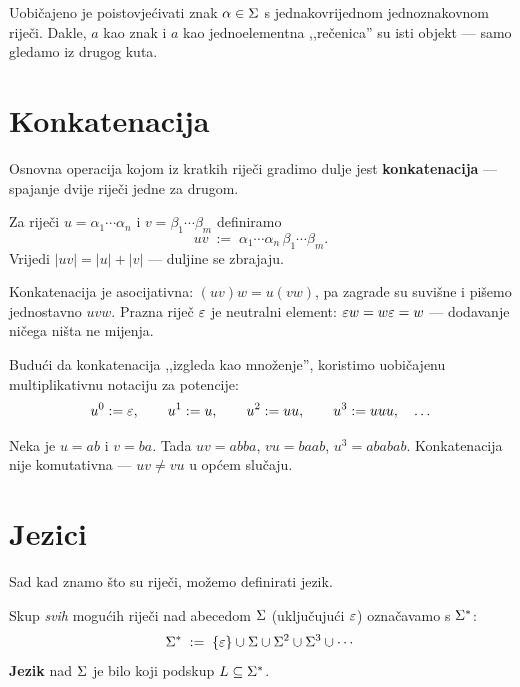 Uobičajeno je poistovjećivati znak $\alpha \in \Sigma$ s jednakovrijednom
jednoznakovnom riječi. Dakle, $a$ kao znak i $a$ kao jednoelementna
,,rečenica'' su isti objekt --- samo gledamo iz drugog kuta.

\section{Konkatenacija}

Osnovna operacija kojom iz kratkih riječi gradimo dulje jest
\textbf{konkatenacija} --- spajanje dvije riječi jedne za drugom.

\begin{definicija}[Konkatenacija]
Za riječi $u = \alpha_1 \cdots \alpha_n$ i $v = \beta_1 \cdots \beta_m$
definiramo
\[
  uv \;:=\; \alpha_1 \cdots \alpha_n \, \beta_1 \cdots \beta_m.
\]
Vrijedi $|uv| = |u| + |v|$ --- duljine se zbrajaju.
\end{definicija}

Konkatenacija je asocijativna: $(uv)w = u(vw)$, pa zagrade su suvišne
i pišemo jednostavno $uvw$. Prazna riječ $\varepsilon$ je neutralni element:
$\varepsilon w = w \varepsilon = w$ --- dodavanje ničega ništa ne mijenja.

Budući da konkatenacija ,,izgleda kao množenje'', koristimo uobičajenu
multiplikativnu notaciju za potencije:
\[
  u^0 := \varepsilon, \qquad u^1 := u, \qquad u^2 := uu, \qquad u^3 := uuu, \quad\ldots
\]

\begin{primjer}
Neka je $u = ab$ i $v = ba$. Tada $uv = abba$, $vu = baab$, $u^3 = ababab$.
Konkatenacija nije komutativna --- $uv \neq vu$ u općem slučaju.
\end{primjer}

\section{Jezici}

Sad kad znamo što su riječi, možemo definirati jezik.

\begin{definicija}
Skup \emph{svih} mogućih riječi nad abecedom $\Sigma$ (uključujući $\varepsilon$)
označavamo s $\Sigma^*$:
\[
  \Sigma^* \;:=\; \{\varepsilon\} \cup \Sigma \cup \Sigma^2 \cup \Sigma^3 \cup \cdots
\]
\textbf{Jezik} nad $\Sigma$ je bilo koji podskup $L \subseteq \Sigma^*$.
\end{definicija}


